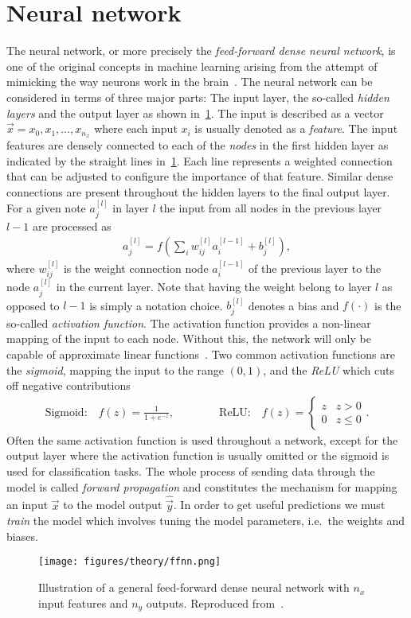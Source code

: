 \section{Neural network}\label{sec:NN}
The neural network, or more precisely the \textit{feed-forward dense neural
network}, is one of the original concepts in machine learning arising from the attempt of mimicking the way neurons work in the
brain~\cite{lederer2021activation, Shankar_2022}. The neural network can
be considered in terms of three major parts: The input layer, the so-called
\textit{hidden layers} and the output layer as shown in~\cref{fig:ffnn}.
The input is described as a vector $\vec{x} = x_0, x_1, \ldots, x_{n_x}$ where
each input $x_i$ is usually denoted as a \textit{feature}. The input features
are densely connected to each of the \textit{nodes} in the first hidden layer as
indicated by the straight lines in~\cref{fig:ffnn}. Each line represents a weighted connection that can be adjusted to configure the importance of that
feature. Similar dense connections are present throughout the hidden layers to
the final output layer. For a given note $a_j^{[l]}$ in layer $l$ the input from
all nodes in the previous layer $l-1$ are processed as
\begin{align*}
  a_j^{[l]} = f\left(\sum_i w^{[l]}_{ij}a_i^{[l-1]} + b_j^{[l]}\right),
\end{align*}
where $w^{[l]}_{ij}$ is the weight connection node $a_i^{[l-1]}$ of the previous layer to the node $a_j^{[l]}$ in the current layer. Note that having the weight belong to layer $l$ as opposed to $l-1$ is simply a notation choice. $b_j^{[l]}$ denotes a bias and $f(\cdot)$ is the so-called \textit{activation function}. The activation function provides a non-linear mapping of the input to each node. Without this, the network will only be capable of approximate linear functions~\cite{lederer2021activation}. Two common activation functions are the \textit{sigmoid}, mapping the input to the range $(0,1)$, and the \textit{ReLU} which cuts off negative contributions
\begin{align*}
  \text{Sigmoid:} \quad f(z) = \frac{1}{1 + e^{-z}}, \qquad \qquad
  \text{ReLU:} \quad 
  f(z)= \begin{cases}
    z & z > 0   \\
    0 & z \leq 0
    \end{cases}.
\end{align*}
Often the same activation function is used throughout a network, except for the output layer where the activation function is usually omitted or the sigmoid is used for classification tasks. The whole process of sending data through the model is called \textit{forward propagation} and constitutes the mechanism for mapping an input $\vec{x}$ to the model output $\hat{\vec{y}}$. In order to get useful predictions we must \textit{train} the model which involves tuning the model parameters, i.e.\ the weights and biases.
\begin{figure}[!htb]
  \centering
  \texttt{[image: figures/theory/ffnn.png]}
  \caption{Illustration of a general feed-forward dense neural network with $n_x$ input features and $n_y$ outputs. Reproduced from~\cite{IN5400_slides}.}
  \label{fig:ffnn}
\end{figure}

